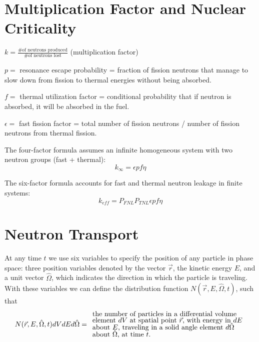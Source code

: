 \documentclass[12pt]{article}
\newcommand{\rvec}{\ensuremath{\vec{r}}}
\newcommand{\omvec}{\ensuremath{\hat{\Omega}}}
\begin{document}
\section*{Multiplication Factor and Nuclear Criticality}

$k=\frac{\text{\# of neutrons produced}}{\text{\# of neutrons lost}}$ (multiplication factor)

$p=$ resonance escape probability = fraction of fission neutrons that manage to slow down from fission to thermal energies without being absorbed.

$f=$ thermal utilization factor = conditional probability that if neutron is absorbed, it will be absorbed in the fuel.

$\epsilon=$ fast fission factor = total number of fission neutrons / number of fission neutrons from thermal fission.

The four-factor formula assumes an infinite homogeneous system with two neutron groups (fast + thermal):
\[
k_{\infty}=\epsilon p f \eta
\]

The six-factor formula accounts for fast and thermal neutron leakage in finite systems:
\[
k_{eff} = P_{FNL}P_{TNL}\epsilon p f\eta
\]

\section*{Neutron Transport}

At any time $t$ we use six variables to specify the
position of any particle in phase space: three position variables denoted by the vector $\rvec$,
the kinetic energy $E$, and a unit vector $\omvec$, which indicates the direction in which the
particle is traveling. With these variables we can define the distribution function
$N(\rvec,E,\omvec,t)$,
such that
\begin{align*}
N(\rvec,E,\omvec,t)dVdEd\omvec = \begin{array}{l}
\text{the number of particles in a differential volume}\vspace{-0.1 cm}\\
\text{element $dV$ at spatial point $\rvec$, with energy in $dE$}\vspace{-0.1 cm}\\
\text{about $E$, traveling in a solid angle element $d\omvec$}\vspace{-0.1 cm}\\
\text{about $\omvec$, at time $t$.}
\end{array}\label{nmbpart}
\end{align*} 
\end{document}
